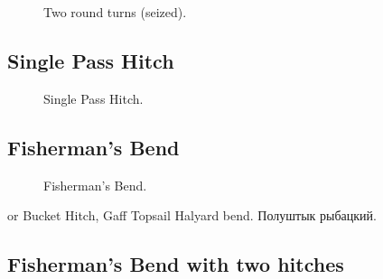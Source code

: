 \begin{figure}[H]\centering
	\begin{minipage}{1\linewidth}
		\begin{center}
			\tcbox[enhanced jigsaw,colframe=black,opacityframe=0.5,opacityback=0.5]
			{\centering{}}
		\end{center}
	\end{minipage}
\caption{Two round turns (seized).}
\label{ris:Two_round_turns_seized}
\end{figure}

\subsection{Single Pass Hitch}

\begin{figure}[H]\centering
	\begin{minipage}{1\linewidth}
		\begin{center}
			\tcbox[enhanced jigsaw,colframe=black,opacityframe=0.5,opacityback=0.5]
			{\centering{}}
		\end{center}
	\end{minipage}
\caption{Single Pass Hitch.}
\label{ris:Single_Pass_Hitch}
\end{figure}

\subsection{Fisherman’s Bend}

\begin{figure}[H]\centering
	\begin{minipage}{1\linewidth}
		\begin{center}
			\tcbox[enhanced jigsaw,colframe=black,opacityframe=0.5,opacityback=0.5]
			{\centering{}}
		\end{center}
	\end{minipage}
\caption{Fisherman’s Bend.}
\label{ris:Fishermans_Bend}
\end{figure}

or Bucket Hitch, Gaff Topsail Halyard bend. Полуштык рыбацкий.

\subsection{Fisherman’s Bend with two hitches}

